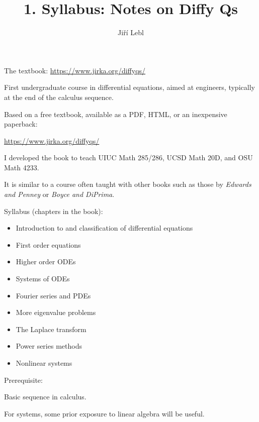 \documentclass[10pt,aspectratio=169]{beamer}
\author{Ji\v{r}\'i Lebl}
\institute[OSU]{%
Oklahoma State University%
}
\title{1. Syllabus: Notes on Diffy Qs}
\date{}
\begin{document}
\begin{frame}
\titlepage


\begin{center}
The textbook: \url{https://www.jirka.org/diffyqs/}
\end{center}
\end{frame}

\begin{frame}
First undergraduate course in differential equations, aimed at engineers,
typically at the end of the calculus sequence.

\pause
\medskip

Based on a free textbook, available as a PDF, HTML, or an inexpensive
paperback:

\url{https://www.jirka.org/diffyqs/}

\pause
\medskip

I developed the book
to teach UIUC Math 285/286, UCSD Math 20D, and OSU Math 4233.

\pause
\medskip

It is similar to a course often taught with other books such as
those by
\emph{Edwards and Penney} or \emph{Boyce and DiPrima}.

\end{frame}

\begin{frame}
Syllabus (chapters in the book):

\begin{itemize}
\item\pause
Introduction to and classification of differential equations
\item\pause
First order equations
\item\pause
Higher order ODEs
\item\pause
Systems of ODEs
\item\pause
Fourier series and PDEs
\item\pause
More eigenvalue problems
\item\pause
The Laplace transform
\item\pause
Power series methods
\item\pause
Nonlinear systems
\end{itemize}
\end{frame}

\begin{frame}
Prerequisite:

\medskip

Basic sequence in calculus.

\medskip

For systems, some prior exposure to linear algebra will be useful.

\end{frame}
\end{document}
